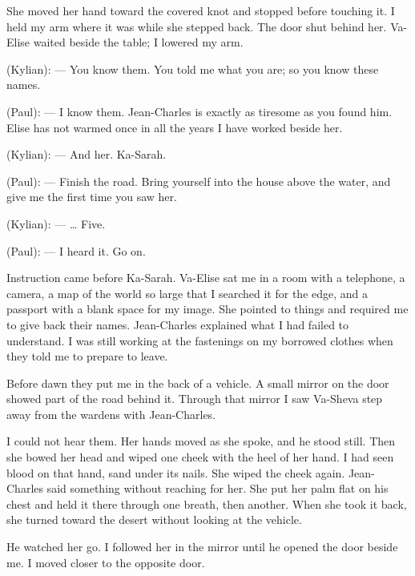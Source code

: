 She moved her hand toward the covered knot and stopped before touching it. I held my arm where it was while she stepped back. The door shut behind her. Va-Elise waited beside the table; I lowered my arm.\par

\ornament

\begin{room}

(Kylian): --- You know them. You told me what you are; so you know these names.

(Paul): --- I know them. Jean-Charles is exactly as tiresome as you found him. Elise has not warmed once in all the years I have worked beside her.

(Kylian): --- And her. Ka-Sarah.

(Paul): --- Finish the road. Bring yourself into the house above the water, and give me the first time you saw her.

(Kylian): --- \ldots{} Five.

(Paul): --- I heard it. Go on.

\end{room}

\ornament

Instruction came before Ka-Sarah. Va-Elise sat me in a room with a telephone, a camera, a map of the world so large that I searched it for the edge, and a passport with a blank space for my image. She pointed to things and required me to give back their names. Jean-Charles explained what I had failed to understand. I was still working at the fastenings on my borrowed clothes when they told me to prepare to leave.\par

Before dawn they put me in the back of a vehicle. A small mirror on the door showed part of the road behind it. Through that mirror I saw Va-Sheva step away from the wardens with Jean-Charles.\par

I could not hear them. Her hands moved as she spoke, and he stood still. Then she bowed her head and wiped one cheek with the heel of her hand. I had seen blood on that hand, sand under its nails. She wiped the cheek again. Jean-Charles said something without reaching for her. She put her palm flat on his chest and held it there through one breath, then another. When she took it back, she turned toward the desert without looking at the vehicle.\par

He watched her go. I followed her in the mirror until he opened the door beside me. I moved closer to the opposite door.\par

